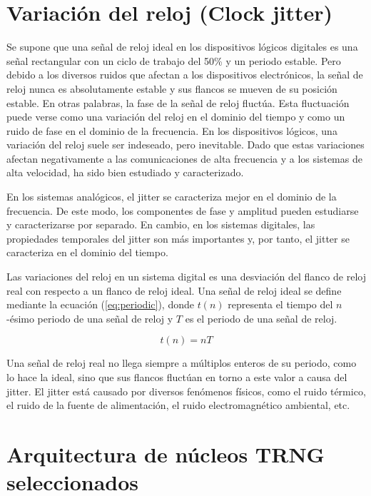 	
	\section{Variación del reloj (Clock jitter)}
	
	Se supone que una señal de reloj ideal en los dispositivos lógicos digitales es una señal rectangular con un ciclo de trabajo del 50\% y un periodo estable. Pero debido a los diversos ruidos que afectan a los dispositivos electrónicos, la señal de reloj nunca es absolutamente estable y sus flancos se mueven de su posición estable. En otras palabras, la fase de la señal de reloj fluctúa. Esta fluctuación puede verse como una variación del reloj en el dominio del tiempo y como un ruido de fase en el dominio de la frecuencia. En los dispositivos lógicos, una variación del reloj suele ser indeseado, pero inevitable. Dado que estas variaciones afectan negativamente a las comunicaciones de alta frecuencia y a los sistemas de alta velocidad, ha sido bien estudiado y caracterizado.
	
	En los sistemas analógicos, el jitter se caracteriza mejor en el dominio de la frecuencia. De este modo, los componentes de fase y amplitud pueden estudiarse y caracterizarse por separado. En cambio, en los sistemas digitales, las propiedades temporales del jitter son más importantes y, por tanto, el jitter se caracteriza en el dominio del tiempo.
	
	Las variaciones del reloj en un sistema digital es una desviación del flanco de reloj real con respecto a un flanco de reloj ideal. Una señal de reloj ideal se define mediante la ecuación (\ref{eq:periodic}), donde $t(n)$ representa el tiempo del $n$-ésimo periodo de una señal de reloj y $T$ es el periodo de una señal de reloj.
	
	\begin{equation}
		t(n) =  n T
	\label{eq:periodic}
	\end{equation}
	
	Una señal de reloj real no llega siempre a múltiplos enteros de su periodo, como lo hace la ideal, sino que sus flancos fluctúan en torno a este valor a causa del jitter. El jitter está causado por diversos fenómenos físicos, como el ruido térmico, el ruido de la fuente de alimentación, el ruido electromagnético ambiental, etc.	
	
	
	
	\section{Arquitectura de núcleos TRNG seleccionados}

